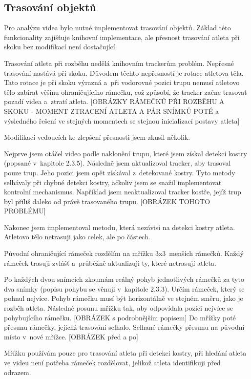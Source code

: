 \subsection{Trasování objektů}

Pro analýzu videa bylo nutné implementovat trasování objektů. Základ této funkcionality zajišťuje knihovní implementace, ale přesnost trasování atleta při skoku bez modifikací není dostačující.

Trasování atleta při rozběhu nedělá knihovním trackerům problém. Nepřesné trasování nastává při skoku. Důvodem těchto nepřesností je rotace atletova těla. Tato rotace je při skoku výrazná a~při vodorovné pozici trupu nemusí atletovo tělo zabírat věšinu ohraničujícího rámečku, což způsobí, že tracker začne trasovat pozadí videa a~ztratí atleta. [OBRÁZKY RÁMEČKŮ PŘI ROZBĚHU A SKOKU - MOMENT ZTRACENÍ ATLETA A PÁR SNÍMKŮ POTÉ a výsledného řešení ve stejných momentech se stejnou inicializací postavy atleta]

Modifikací vedoucích ke zlepšení přesnosti jsem zkusil několik.

Nejprve jsem otáčel video podle naklonění trupu, které jsem získal detekcí kostry (popsané v~kapitole 2.3.5). Následně jsem aktualizoval tracker, aby trasoval pouze trup. Jeho pozici jsem opět získával z~detekované kostry. Tyto metody selhávaly při chybné detekci kostry, ačkoliv jsem se snažil implementovat kontrolní mechanismus. Například jsem neaktualizoval tracker kostře, jejíž trup byl příliš daleko od právě trasovaného trupu. [OBRÁZEK TOHOTO PROBLÉMU]

Nakonec jsem implementoval metodu, která nezávisí na detekci kostry atleta. Atletovo tělo netrasuji jako celek, ale po částech.

Původní ohraničující rámeček rozdělím na mřížku 3x3~menších rámečků. Každý rámeček trasuji zvlášť a~průběžně aktualizuji ty, které netrasují atleta.

Po každých dvou snímcích zkoumám reálný pohyb jednotlivých rámečků za tyto dva snímky (popisu pohybu se věnuji v~kapitole 2.3.3). Určím rámeček, který se pohnul nejvíce. Pohyb rámečku musí být horizontálně ve stejném směru, jako je rozběh atleta. Následně posunu mřížku tak, aby odpovídala pozici nejvíce se pohybujícího rámečku. [OBRÁZEK s podrobnějším popisem] Do mřížky poté přesunu rámečky, jejichž trasování selhalo. Selhané rámečky přesunu na původní místo v~nové mřížce. [OBRÁZEK před a po]

Mřížku používám pouze pro trasování atleta při detekci kostry, při hledání atleta ve videu není potřeba rámeček rozdělovat, jelikož atleta identifikuji před odrazem.

